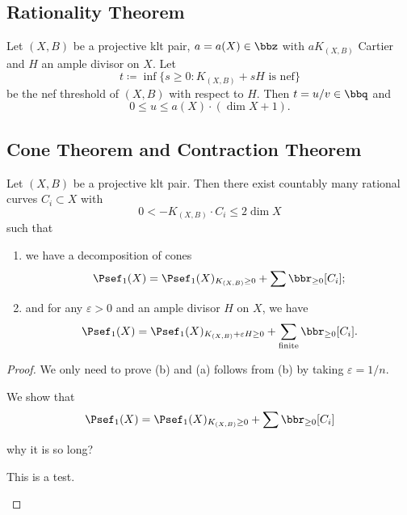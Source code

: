 \subsection{Rationality Theorem}

    \begin{theorem}\label{thm: rationality theorem}
        Let \((X,B)\) be a projective klt pair, \(a = a(X) \in \bbz\) with \(aK_{(X,B)}\) Cartier and \(H\) an ample divisor on \(X\).
        Let 
        \[ t \coloneqq \inf \{s \geq 0: K_{(X,B)} + sH \text{ is nef}\} \]
        be the nef threshold of \((X,B)\) with respect to \(H\).
        Then \(t = u/v \in \bbq\) and 
        \[ 0 \leq u \leq a(X)\cdot (\dim X + 1). \]
    \end{theorem}


\subsection{Cone Theorem and Contraction Theorem}

    \begin{theorem}\label{thm: cone theorem}
        Let \((X,B)\) be a projective klt pair.
        Then there exist countably many rational curves \(C_i \subset X\) with 
        \[ 0 < -K_{(X,B)} \cdot C_i \leq 2 \dim X \]
        such that 
        \begin{enumerate}
            \item we have a decomposition of cones
            \[ \Psef_1(X) = \Psef_1(X)_{K_{(X,B)} \geq 0} + \sum \bbr_{\geq 0}[C_i]; \]
            \item and for any \(\varepsilon > 0\) and an ample divisor \(H\) on \(X\), we have 
            \[ \Psef_1(X) = \Psef_1(X)_{K_{(X,B)}+\varepsilon H \geq 0} + \sum_{\text{finite}} \bbr_{\geq 0}[C_i]. \]
        \end{enumerate}
    \end{theorem}
    \begin{proof}
        We only need to prove (b) and (a) follows from (b) by taking \(\varepsilon = 1/n\).

        \begin{step}
            We show that 
            \[ \Psef_1(X) = \Psef_1(X)_{K_{(X,B)} \geq 0} + \sum \bbr_{\geq 0}[C_i] \]
        \end{step}
        why it is so long?


        \begin{step}\label{step: test label}
            This is a test.
        \end{step}


    \end{proof}

